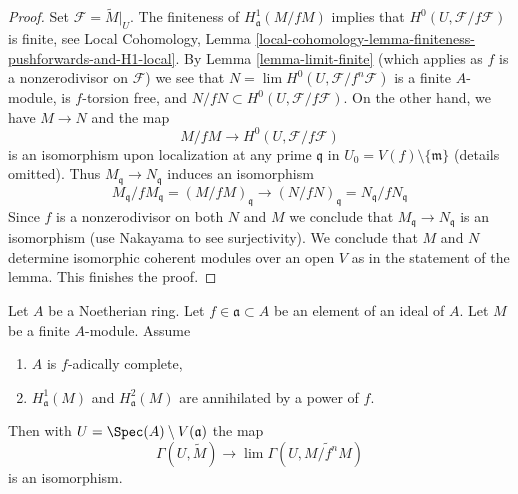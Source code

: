 \begin{proof}
Set $\mathcal{F} = \widetilde{M}|_U$.
The finiteness of $H^1_\mathfrak a(M/fM)$ implies that
$H^0(U, \mathcal{F}/f\mathcal{F})$ is finite, see
Local Cohomology, Lemma
\ref{local-cohomology-lemma-finiteness-pushforwards-and-H1-local}.
By Lemma \ref{lemma-limit-finite} (which applies as $f$ is a
nonzerodivisor on $\mathcal{F}$)
we see that $N = \lim H^0(U, \mathcal{F}/f^n\mathcal{F})$
is a finite $A$-module, is $f$-torsion free, and
$N/fN \subset H^0(U, \mathcal{F}/f\mathcal{F})$.
On the other hand, we have $M \to N$ and the map
$$
M/fM \longrightarrow H^0(U, \mathcal{F}/f\mathcal{F})
$$
is an isomorphism upon localization at any prime $\mathfrak q$ in
$U_0 = V(f) \setminus \{\mathfrak m\}$ (details omitted). Thus
$M_\mathfrak q \to N_\mathfrak q$ induces an isomorphism
$$
M_\mathfrak q/fM_\mathfrak q =
(M/fM)_\mathfrak q \to (N/fN)_\mathfrak q =
N_\mathfrak q/fN_\mathfrak q
$$
Since $f$ is a nonzerodivisor on both $N$ and $M$ we conclude
that $M_\mathfrak q \to N_\mathfrak q$ is an isomorphism (use
Nakayama to see surjectivity). We conclude that $M$ and $N$
determine isomorphic coherent modules over an open $V$
as in the statement of the lemma. This finishes the proof.
\end{proof}

\begin{lemma}
\label{lemma-alternative-H0}
Let $A$ be a Noetherian ring. Let $f \in \mathfrak a \subset A$
be an element of an ideal of $A$. Let $M$ be a finite $A$-module.
Assume
\begin{enumerate}
\item $A$ is $f$-adically complete,
\item $H^1_\mathfrak a(M)$ and $H^2_\mathfrak a(M)$ are
annihilated by a power of $f$.
\end{enumerate}
Then with $U = \Spec(A) \setminus V(\mathfrak a)$ the map
$$
\Gamma(U, \widetilde{M})
\longrightarrow
\lim \Gamma(U, \widetilde{M/f^nM})
$$
is an isomorphism.
\end{lemma}

